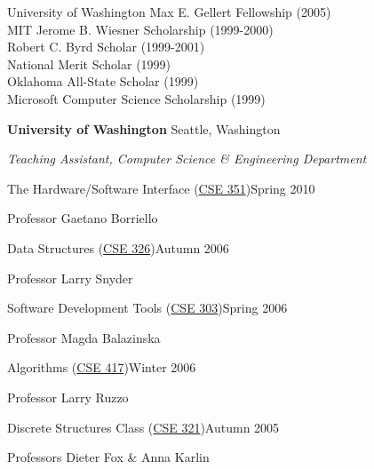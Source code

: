 \documentclass[letter]{article}
\begin{document}
\vspace{\baselineskip}
University of Washington Max E. Gellert Fellowship (2005)\\
MIT Jerome B. Wiesner Scholarship (1999-2000)\\
Robert C. Byrd Scholar (1999-2001)\\
National Merit Scholar (1999)\\
Oklahoma All-State Scholar (1999)\\
Microsoft Computer Science Scholarship (1999)
\par

\vspace{\baselineskip}

{\bf University of Washington} \hfill Seattle, Washington

\par
{\em Teaching Assistant, Computer Science \& Engineering Department}

\vspace{0.5\baselineskip}
\par
The Hardware/Software Interface (\href{http://www.cs.washington.edu/education/courses/351/10sp/}{CSE 351})\hfill Spring 2010
\par
Professor Gaetano Borriello

\vspace{0.5\baselineskip}
\par
Data Structures (\href{http://www.cs.washington.edu/education/courses/326/06au/}{CSE 326})\hfill Autumn 2006
\par
Professor Larry Snyder

\vspace{0.5\baselineskip}
\par
Software Development Tools (\href{http://www.cs.washington.edu/education/courses/303/06sp/}{CSE 303})\hfill Spring 2006
\par
Professor Magda Balazinska

\vspace{0.5\baselineskip}
\par
Algorithms (\href{http://www.cs.washington.edu/education/courses/417/06wi/}{CSE 417})\hfill Winter 2006
\par
Professor Larry Ruzzo

\vspace{0.5\baselineskip}
\par
Discrete Structures Class (\href{http://www.cs.washington.edu/education/courses/321/05au/}{CSE 321})\hfill Autumn 2005
\par
Professors Dieter Fox \& Anna Karlin
\par
\end{document}
